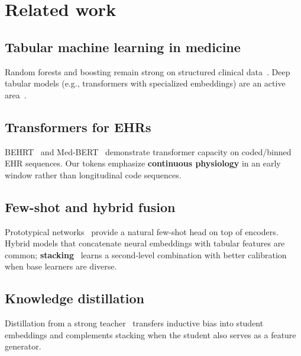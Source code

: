 \section{Related work}
\label{sec:related}

\subsection{Tabular machine learning in medicine}
Random forests and boosting remain strong on structured clinical data~\citep{awad2017random,caruana2015intelligible}. Deep tabular models (e.g., transformers with specialized embeddings) are an active area~\citep{hegselmann2023tabllm}.

\subsection{Transformers for EHRs}
BEHRT~\citep{li2020behrt} and Med-BERT~\citep{rasmy2021med} demonstrate transformer capacity on coded/binned EHR sequences. Our tokens emphasize \textbf{continuous physiology} in an early window rather than longitudinal code sequences.

\subsection{Few-shot and hybrid fusion}
Prototypical networks~\citep{snell2017prototypical} provide a natural few-shot head on top of encoders. Hybrid models that concatenate neural embeddings with tabular features are common; \textbf{stacking}~\citep{wolpert1992stacked} learns a second-level combination with better calibration when base learners are diverse.

\subsection{Knowledge distillation}
Distillation from a strong teacher~\citep{hinton2015distilling} transfers inductive bias into student embeddings and complements stacking when the student also serves as a feature generator.
